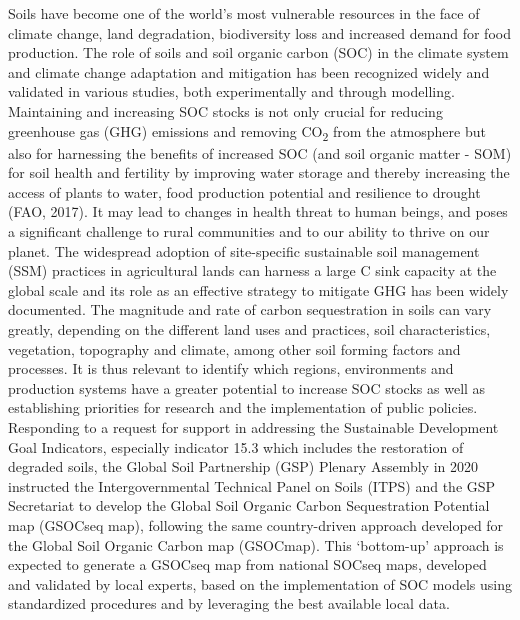 \documentclass[
  10pt,
  b5paper,
]{book}
\begin{document}
Soils have become one of the world's most vulnerable resources in the face of climate change, land degradation, biodiversity loss and increased demand for food production. The role of soils and soil organic carbon (SOC) in the climate system and climate change adaptation and mitigation has been recognized widely and validated in various studies, both experimentally and through modelling. Maintaining and increasing SOC stocks is not only crucial for reducing greenhouse gas (GHG) emissions and removing CO\textsubscript{2} from the atmosphere but also for harnessing the benefits of increased SOC (and soil organic matter - SOM) for soil health and fertility by improving water storage and thereby increasing the access of plants to water, food production potential and resilience to drought (FAO, 2017). It may lead to changes in health threat to human beings, and poses a significant challenge to rural communities and to our ability to thrive on our planet. The widespread adoption of site-specific sustainable soil management (SSM) practices in agricultural lands can harness a large C sink capacity at the global scale and its role as an effective strategy to mitigate GHG has been widely documented.
The magnitude and rate of carbon sequestration in soils can vary greatly, depending on the different land uses and practices, soil characteristics, vegetation, topography and climate, among other soil forming factors and processes. It is thus relevant to identify which regions, environments and production systems have a greater potential to increase SOC stocks as well as establishing priorities for research and the implementation of public policies.
Responding to a request for support in addressing the Sustainable Development Goal Indicators, especially indicator 15.3 which includes the restoration of degraded soils, the Global Soil Partnership (GSP) Plenary Assembly in 2020 instructed the Intergovernmental Technical Panel on Soils (ITPS) and the GSP Secretariat to develop the Global Soil Organic Carbon Sequestration Potential map (GSOCseq map), following the same country-driven approach developed for the Global Soil Organic Carbon map (GSOCmap). This `bottom-up' approach is expected to generate a GSOCseq map from national SOCseq maps, developed and validated by local experts, based on the implementation of SOC models using standardized procedures and by leveraging the best available local data.
\end{document}
